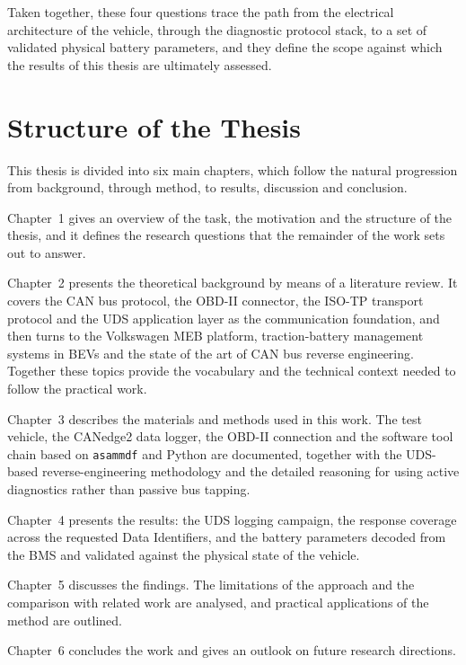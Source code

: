 \documentclass[11pt,a4paper,oneside,parskip=half]{scrreprt}
\begin{document}
Taken together, these four questions trace the path from the electrical architecture of the vehicle, through the diagnostic protocol stack, to a set of validated physical battery parameters, and they define the scope against which the results of this thesis are ultimately assessed.

\section{Structure of the Thesis}
This thesis is divided into six main chapters, which follow the natural progression from background, through method, to results, discussion and conclusion.

Chapter~1 gives an overview of the task, the motivation and the structure of the thesis, and it defines the research questions that the remainder of the work sets out to answer.

Chapter~2 presents the theoretical background by means of a literature review. It covers the CAN bus protocol, the OBD-II connector, the ISO-TP transport protocol and the UDS application layer as the communication foundation, and then turns to the Volkswagen MEB platform, traction-battery management systems in BEVs and the state of the art of CAN bus reverse engineering. Together these topics provide the vocabulary and the technical context needed to follow the practical work.

Chapter~3 describes the materials and methods used in this work. The test vehicle, the CANedge2 data logger, the OBD-II connection and the software tool chain based on \texttt{asammdf} and Python are documented, together with the UDS-based reverse-engineering methodology and the detailed reasoning for using active diagnostics rather than passive bus tapping.

Chapter~4 presents the results: the UDS logging campaign, the response coverage across the requested Data Identifiers, and the battery parameters decoded from the BMS and validated against the physical state of the vehicle.

Chapter~5 discusses the findings. The limitations of the approach and the comparison with related work are analysed, and practical applications of the method are outlined.

Chapter~6 concludes the work and gives an outlook on future research directions.


\end{document}
